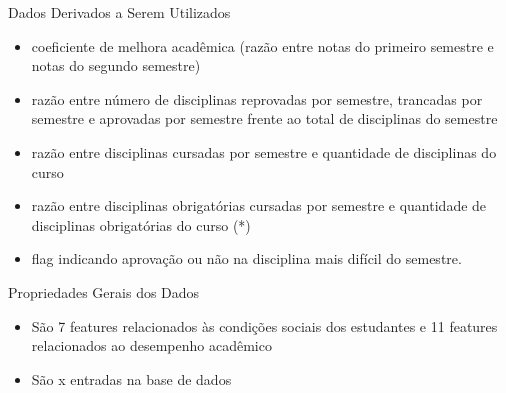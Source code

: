 \begin{frame}{Dados Derivados a Serem Utilizados}
    \begin{itemize}[itemsep=3ex]
        \item coeficiente de melhora acadêmica (razão entre notas do primeiro semestre
            e notas do segundo semestre) 
        \item razão entre número de disciplinas reprovadas por semestre, trancadas
            por semestre e aprovadas por semestre frente ao total de disciplinas do
            semestre
        \item razão entre disciplinas cursadas por semestre e quantidade 
            de disciplinas do curso 
        \item razão entre disciplinas obrigatórias cursadas por semestre e quantidade 
            de disciplinas obrigatórias do curso (*)
        \item flag indicando aprovação ou não na disciplina mais difícil do semestre.
    \end{itemize}
\end{frame}

\begin{frame}{Propriedades Gerais dos Dados}
    \begin{itemize}[itemsep=3ex]
        \item São 7 features relacionados às condições sociais dos estudantes e 11
            features relacionados ao desempenho acadêmico
        \item São x entradas na base de dados 
    \end{itemize}
\end{frame}


